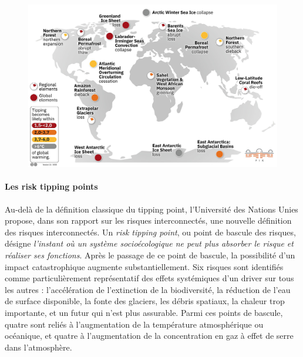 \begin{figure}
    \centering
    \includegraphics[width=1\linewidth]{figures/Tipping_points_2022_list.jpeg}
    \label{fig:tipping-points-earth}
\end{figure}

\paragraph{Les risk tipping points}

Au-delà de la définition classique du tipping point, l'Université des Nations Unies propose, dans son rapport sur les risques interconnectés, une nouvelle définition des risques interconnectés. Un \textit{risk tipping point}, ou point de bascule des risques, désigne \textit{l'instant où un système socioécologique ne peut plus absorber le risque et réaliser ses fonctions}. Après le passage de ce point de bascule, la possibilité d'un impact catastrophique augmente substantiellement. Six risques sont identifiés comme particulièrement représentatif des effets systémiques d'un driver sur tous les autres : l'accélération de l'extinction de la biodiversité, la réduction de l'eau de surface disponible, la fonte des glaciers, les débris spatiaux, la chaleur trop importante, et un futur qui n'est plus assurable. Parmi ces points de bascule, quatre sont  reliés à l'augmentation de la température atmosphérique ou océanique, et quatre à l'augmentation de la concentration en gaz à effet de serre dans l'atmosphère. \cite{united_nations_university_-_institute_for_environment_and_human_security_unu-ehs_interconnected_2023}

